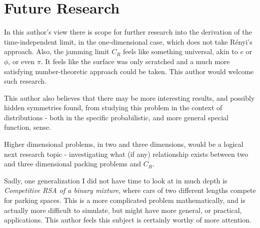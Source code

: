 \section{Future Research}

In this author's view there is scope for further research into the derivation of the 
time-independent limit, in the one-dimensional case, which does not take R\'enyi's 
approach. Also, the jamming limit $C_R$ feels like something universal, akin to $e$ 
or $\phi$, or even $\pi$. It feels like the surface was only scratched and a much more 
satisfying number-theoretic approach could be taken. This author would welcome such 
research. \bigskip

This author also believes that there may be more interesting results, and possibly 
hidden symmetries found, from studying this problem in the context of distributions 
- both in the specific probabilistic, and more general special function, sense. \bigskip

Higher dimensional problems, in two and three dimensions, would be a logical next 
research topic - investigating what (if any) relationship exists between two and 
three dimensional packing problems and $C_R$. \bigskip

Sadly, one generalization I did not have time to look at in much depth is 
\emph{Competitive RSA of a binary mixture}, where cars of two different lengths 
compete for parking spaces. This is a more complicated problem mathematically, and 
is actually more difficult to simulate, but might have more general, or practical, 
applications. This author feels this subject is certainly worthy of more attention. \bigskip










